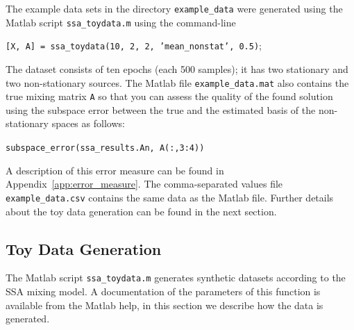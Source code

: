 \documentclass{article}
\newcommand{\1}{\ensuremath{\mathds{1}}}
\newcommand{\0}{\ensuremath{0}}
\begin{document}
The example data sets in the directory \texttt{example\_data} were generated using the Matlab 
script \texttt{ssa\_toydata.m} using the command-line
\begin{center}
	\texttt{[X, A] = ssa\_toydata(10, 2, 2, 'mean\_nonstat', 0.5)}; 
\end{center}
The dataset consists of ten epochs (each 500 samples); it has two stationary and two non-stationary 
sources. The Matlab file \texttt{example\_data.mat} also contains the true mixing matrix \texttt{A} 
so that you can assess the quality of the found solution using the subspace error between the true
and the estimated basis of the non-stationary spaces as follows:
\begin{center}
	\texttt{subspace\_error(ssa\_results.An, A(:,3:4))}  
\end{center}
A description of this error measure can be found in Appendix~\ref{app:error_measure}. The comma-separated 
values file \texttt{example\_data.csv} contains the same data as the Matlab file. Further details about 
the toy data generation can be found in the next section. 

\subsection{Toy Data Generation}

The Matlab script \texttt{ssa\_toydata.m} generates synthetic datasets according to the SSA mixing 
model. A documentation of the parameters of this function is available from the Matlab help, in this 
section we describe how the data is generated. 
\end{document}
